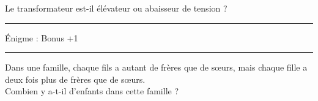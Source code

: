 \documentclass[11pt,a4paper]{article}
\newcommand{\cadreblanc}[1]{%
\medskip\framebox[\linewidth][c]{%
\rule{0mm}{#1mm}}\par
\medskip}
\begin{document}
 Le transformateur est-il élévateur ou abaisseur de tension ? 

\cadreblanc{15}

\vfill 


\hrule 
\begin{center}
   \Large{Énigme : Bonus +1} \\[5mm]
\end{center}



\hrule

  Dans une famille, chaque fils a autant de frères que de sœurs, mais chaque fille a deux fois plus de frères que de sœurs. \\[3mm]
  Combien y a-t-il d'enfants dans cette famille ?

  \cadreblanc{35}

  \vfill 
  
\end{document}
